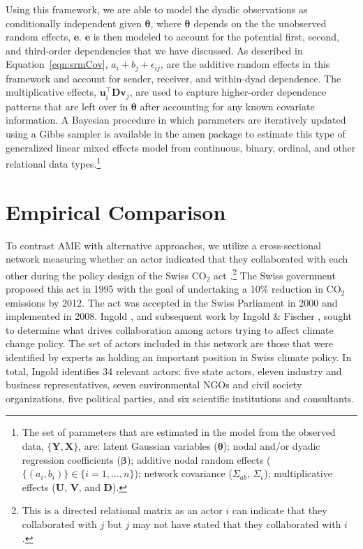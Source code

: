 \documentclass[9pt,twocolumn,twoside,lineno]{pnas-new}
\newcommand{\pkg}[1]{{\fontseries{b}\selectfont #1}}
\begin{document}
Using this framework, we are able to model the dyadic observations as conditionally independent given $\bm\theta$, where $\bm\theta$ depends on the the unobserved random effects, $\mathbf{e}$. $\mathbf{e}$ is then modeled to account for the potential first, second, and third-order dependencies that we have discussed. As described in Equation~\ref{eqn:srmCov}, $a_{i} + b_{j}  + \epsilon_{ij}$, are the additive random effects in this framework and account for sender, receiver, and within-dyad dependence. The multiplicative effects, $\textbf{u}_{i}^{\top} \textbf{D} \textbf{v}_{j}$, are used to capture higher-order dependence patterns that are left over in $\bm\theta$ after accounting for any known covariate information. A Bayesian procedure in which parameters are iteratively updated using a Gibbs sampler is available in the \pkg{amen} package to estimate this type of generalized linear mixed effects model from continuous, binary, ordinal, and other relational data types.\footnote{The set of parameters that are estimated in the model from the observed data, $\{\mathbf{Y}, \mathbf{X}\}$, are: latent Gaussian variables ($\bm\theta$); nodal and/or dyadic regression coefficients ($\bm\beta$); additive nodal random effects ($\{(a_{i},b_{i})\} \in \{i=1, \ldots, n \}$); network covariance ($\Sigma_{ab},\, \Sigma_{\epsilon}$); multiplicative effects ($\mathbf{U}$, $\mathbf{V}$, and $\mathbf{D}$).}

\section*{\textbf{Empirical Comparison}}

To contrast AME with alternative approaches, we utilize a cross-sectional network measuring whether an actor indicated that they collaborated with each other during the policy design of the Swiss CO$_{2}$ act \citep{ingold:2008}.\footnote{This is a directed relational matrix as an actor $i$ can indicate that they collaborated with $j$ but $j$ may not have stated that they collaborated with $i$.} The Swiss government proposed this act in 1995 with the goal of undertaking a 10\% reduction in CO$_{2}$ emissions by 2012. The act was accepted in the Swiss Parliament in 2000 and implemented in 2008. Ingold \cite{ingold:2008}, and subsequent work by Ingold \& Fischer \cite{ingold:fischer:2014}, sought to determine what drives collaboration among actors trying to affect climate change policy. The set of actors included in this network are those that were identified by experts as holding an important position in Swiss climate policy. In total, Ingold identifies 34 relevant actors: five state actors, eleven industry and business representatives, seven environmental NGOs and civil society organizations, five political parties, and six scientific institutions and consultants.
\end{document}

